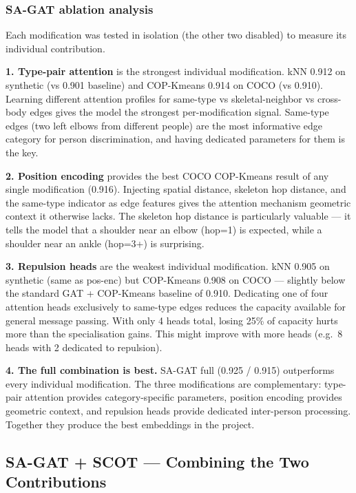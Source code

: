 \subsubsection{SA-GAT ablation analysis}

Each modification was tested in isolation (the other two disabled) to measure its individual contribution.

\textbf{1. Type-pair attention} is the strongest individual modification. kNN 0.912 on synthetic (vs 0.901 baseline) and COP-Kmeans 0.914 on COCO (vs 0.910). Learning different attention profiles for same-type vs skeletal-neighbor vs cross-body edges gives the model the strongest per-modification signal. Same-type edges (two left elbows from different people) are the most informative edge category for person discrimination, and having dedicated parameters for them is the key.

\textbf{2. Position encoding} provides the best COCO COP-Kmeans result of any single modification (0.916). Injecting spatial distance, skeleton hop distance, and the same-type indicator as edge features gives the attention mechanism geometric context it otherwise lacks. The skeleton hop distance is particularly valuable --- it tells the model that a shoulder near an elbow (hop=1) is expected, while a shoulder near an ankle (hop=3+) is surprising.

\textbf{3. Repulsion heads} are the weakest individual modification. kNN 0.905 on synthetic (same as pos-enc) but COP-Kmeans 0.908 on COCO --- slightly below the standard GAT + COP-Kmeans baseline of 0.910. Dedicating one of four attention heads exclusively to same-type edges reduces the capacity available for general message passing. With only 4 heads total, losing 25\% of capacity hurts more than the specialisation gains. This might improve with more heads (e.g.\ 8 heads with 2 dedicated to repulsion).

\textbf{4. The full combination is best.} SA-GAT full (0.925 / 0.915) outperforms every individual modification. The three modifications are complementary: type-pair attention provides category-specific parameters, position encoding provides geometric context, and repulsion heads provide dedicated inter-person processing. Together they produce the best embeddings in the project.


\subsection{SA-GAT + SCOT --- Combining the Two Contributions}

